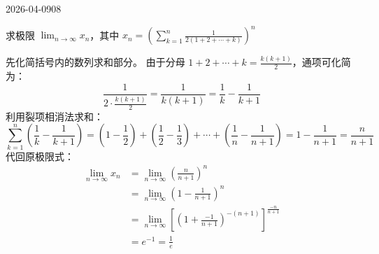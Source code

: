 \begin{mistake}{2026-04-09}{08}

\begin{problemcontent}
求极限 \(\displaystyle \lim_{n \to \infty} x_n \)，其中 \(\displaystyle x_n = \left( \sum_{k=1}^{n} \frac{1}{2(1+2+\cdots+k)} \right)^n\)
\end{problemcontent}

\begin{solutioncontent}
先化简括号内的数列求和部分。
由于分母 \(1+2+\cdots+k = \frac{k(k+1)}{2}\)，通项可化简为：
\[ \frac{1}{2 \cdot \frac{k(k+1)}{2}} = \frac{1}{k(k+1)} = \frac{1}{k} - \frac{1}{k+1} \]
利用裂项相消法求和：
\[ \sum_{k=1}^{n} \left( \frac{1}{k} - \frac{1}{k+1} \right) = \left(1-\frac{1}{2}\right) + \left(\frac{1}{2}-\frac{1}{3}\right) + \cdots + \left(\frac{1}{n}-\frac{1}{n+1}\right) = 1 - \frac{1}{n+1} = \frac{n}{n+1} \]
代回原极限式：
\[
\begin{aligned}
\lim_{n \to \infty} x_n 
&= \lim_{n \to \infty} \left( \frac{n}{n+1} \right)^n \\
&= \lim_{n \to \infty} \left( 1 - \frac{1}{n+1} \right)^n \\
&= \lim_{n \to \infty} \left[ \left( 1 + \frac{-1}{n+1} \right)^{-(n+1)} \right]^{\frac{-n}{n+1}} \\
&= e^{-1} = \frac{1}{e}
\end{aligned}
\]
\end{solutioncontent}


\end{mistake}
